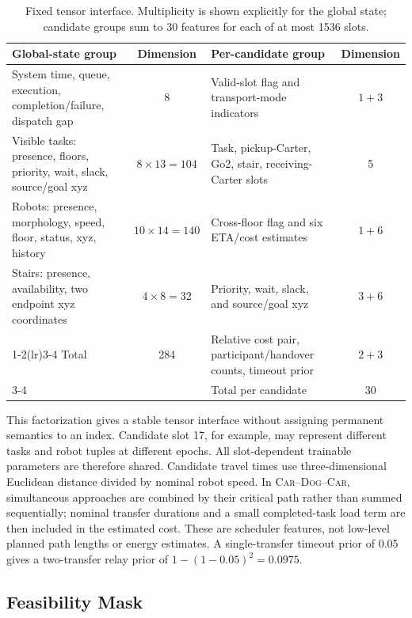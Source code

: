 \documentclass[journal]{IEEEtran}
\DeclareRobustCommand{\modechain}{\mbox{\textsc{Car--Dog--Car}}\xspace}
\begin{document}
\begin{table}[!t]
\centering
\caption{Fixed tensor interface. Multiplicity is shown explicitly for the global state; candidate groups sum to 30 features for each of at most 1536 slots.}
\label{tab:encoding_breakdown}
\footnotesize
\setlength{\tabcolsep}{4.0pt}
\begin{tabular}{p{}cp{}c}
\toprule
Global-state group & Dimension & Per-candidate group & Dimension \\
\midrule
System time, queue, execution, completion/failure, dispatch gap & 8
& Valid-slot flag and transport-mode indicators & $1+3$ \\
Visible tasks: presence, floors, priority, wait, slack, source/goal xyz & $8\times13=104$
& Task, pickup-Carter, Go2, stair, receiving-Carter slots & 5 \\
Robots: presence, morphology, speed, floor, status, xyz, history & $10\times14=140$
& Cross-floor flag and six ETA/cost estimates & $1+6$ \\
Stairs: presence, availability, two endpoint xyz coordinates & $4\times8=32$
& Priority, wait, slack, and source/goal xyz & $3+6$ \\
\cmidrule(lr){1-2}\cmidrule(lr){3-4}
Total & 284
& Relative cost pair, participant/handover counts, timeout prior & $2+3$ \\
\cmidrule(lr){3-4}
& & Total per candidate & 30 \\
\bottomrule
\end{tabular}
\end{table}

This factorization gives a stable tensor interface without assigning permanent semantics to an index. Candidate slot 17, for example, may represent different tasks and robot tuples at different epochs. All slot-dependent trainable parameters are therefore shared. Candidate travel times use three-dimensional Euclidean distance divided by nominal robot speed. In \modechain, simultaneous approaches are combined by their critical path rather than summed sequentially; nominal transfer durations and a small completed-task load term are then included in the estimated cost. These are scheduler features, not low-level planned path lengths or energy estimates. A single-transfer timeout prior of 0.05 gives a two-transfer relay prior of $1-(1-0.05)^2=0.0975$.

\subsection{Feasibility Mask}
\end{document}
